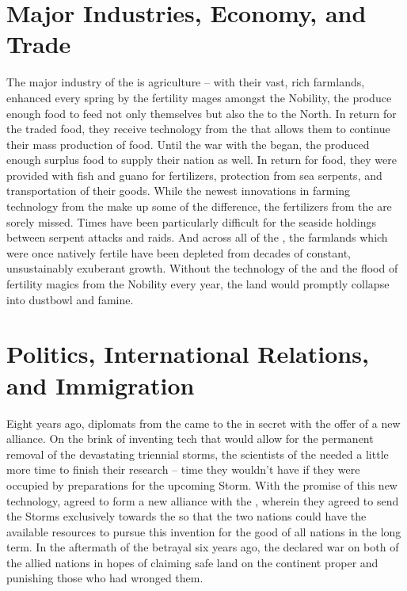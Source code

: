 \documentclass[blue]{GL2020}
\begin{document}
\section*{Major Industries, Economy, and Trade}
The major industry of the \pFarm{} is agriculture -- with their vast, rich farmlands, enhanced every spring by the fertility mages amongst the Nobility, the \pFarmers{} produce enough food to feed not only themselves but also the \pTech{} to the North.  In return for the traded food, they receive technology from the \pTech{} that allows them to continue their mass production of food.  Until the war with the \pShippies{} began, the \pFarm{} produced enough surplus food to supply their nation as well.  In return for food, they were provided with fish and guano for fertilizers, protection from sea serpents, and transportation of their goods.  While the newest innovations in farming technology from the \pTech{} make up some of the difference, the fertilizers from the \pShip{} are sorely missed.  Times have been particularly difficult for the seaside holdings between serpent attacks and \pShip{} raids.  And across all of the \pFarm{}, the farmlands which were once natively fertile have been depleted from decades of constant, unsustainably exuberant growth.  Without the technology of the \pTech{} and the flood of fertility magics from the Nobility every year, the land would promptly collapse into dustbowl and famine.

\section*{Politics, International Relations, and Immigration}
Eight years ago, diplomats from the \pTech{} came to the \pFarm{} in secret with the offer of a new alliance.  On the brink of inventing tech that would allow for the permanent removal of the devastating triennial storms, the scientists of the \pTech{} needed a little more time to finish their research – time they wouldn’t have if they were occupied by preparations for the upcoming Storm.  With the promise of this new technology, \cQueen{\Majesty} \cQueen{} agreed to form a new alliance with the \pTech{}, wherein they agreed to send the Storms exclusively towards the \pShip{} so that the two nations could have the available resources to pursue this invention for the good of all nations in the long term.  In the aftermath of the betrayal six years ago, the \pShip{} declared war on both of the allied nations in hopes of claiming safe land on the continent proper and punishing those who had wronged them.
\end{document}
